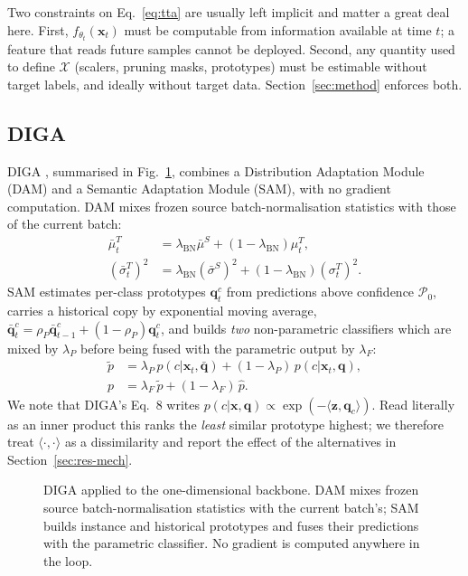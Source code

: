 \documentclass[a4paper,fleqn]{cas-dc}
\begin{document}
Two constraints on Eq.~\ref{eq:tta} are usually left implicit and matter a great deal
here. First, $f_{\theta_t}(\mathbf{x}_t)$ must be computable from information available at
time $t$; a feature that reads future samples cannot be deployed. Second, any quantity
used to define $\mathcal{X}$ (scalers, pruning masks, prototypes) must be estimable
without target labels, and ideally without target data. Section~\ref{sec:method} enforces
both.

\subsection{DIGA}

DIGA \cite{diga}, summarised in Fig.~\ref{fig:diga}, combines a Distribution Adaptation Module (DAM) and a Semantic Adaptation
Module (SAM), with no gradient computation. DAM mixes frozen source batch-normalisation
statistics with those of the current batch:
\begin{align}
\bar\mu^{T}_t &= \lambda_{\mathrm{BN}}\bar\mu^{S}+(1-\lambda_{\mathrm{BN}})\mu^{T}_t, \nonumber\\
(\bar\sigma^{T}_t)^2 &= \lambda_{\mathrm{BN}}(\bar\sigma^{S})^2+(1-\lambda_{\mathrm{BN}})(\sigma^{T}_t)^2 .
\label{eq:dam}
\end{align}
SAM estimates per-class prototypes $\mathbf{q}^c_t$ from predictions above confidence
$\mathcal{P}_0$, carries a historical copy by exponential moving average,
$\bar{\mathbf{q}}^c_t=\rho_P\bar{\mathbf{q}}^c_{t-1}+(1-\rho_P)\mathbf{q}^c_t$, and builds
\emph{two} non-parametric classifiers which are mixed by $\lambda_P$ before being fused
with the parametric output by $\lambda_F$:
\begin{align}
\tilde p &= \lambda_P\,p(c|\mathbf{x}_t,\bar{\mathbf{q}})+(1-\lambda_P)\,p(c|\mathbf{x}_t,\mathbf{q}), \\
p &= \lambda_F\,\tilde p+(1-\lambda_F)\,\hat p .
\label{eq:diga-fuse}
\end{align}
We note that DIGA's Eq.~8 writes $p(c|\mathbf{x},\mathbf{q})\propto\exp(-\langle
\mathbf{z},\mathbf{q}_c\rangle)$. Read literally as an inner product this ranks the
\emph{least} similar prototype highest; we therefore treat $\langle\cdot,\cdot\rangle$ as
a dissimilarity and report the effect of the alternatives in
Section~\ref{sec:res-mech}.


\begin{figure}[t]
\centering
\resizebox{0.95\columnwidth}{!}{\figDIGA}
\caption{DIGA applied to the one-dimensional backbone. DAM mixes frozen source
batch-normalisation statistics with the current batch's; SAM builds instance and
historical prototypes and fuses their predictions with the parametric classifier. No
gradient is computed anywhere in the loop.}
\label{fig:diga}
\end{figure}
\end{document}
